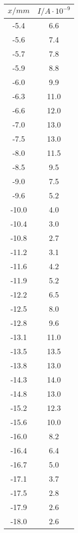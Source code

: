\begin{table}
\begin{minipage}{0.25\textwidth}
	\label{tab:b}
	\begin{tabular}{c|c}
		\toprule
		{$x / mm$} & {$I / A\cdot10^{-9}$} \\
		\hline
        \midrule
        -5.4 & 6.6\\
        -5.6 & 7.4\\
        -5.7 & 7.8\\
        -5.9 & 8.8\\
        -6.0 & 9.9\\
        -6.3 & 11.0\\
        -6.6 & 12.0\\
        -7.0 & 13.0\\
        -7.5 & 13.0\\
        -8.0 & 11.5\\
        -8.5 & 9.5\\
        -9.0 & 7.5\\
        -9.6 & 5.2\\
        -10.0 & 4.0\\
        -10.4 & 3.0\\
        -10.8 & 2.7\\
        -11.2 & 3.1\\
        -11.6 & 4.2\\
        -11.9 & 5.2\\
        -12.2 & 6.5\\
        -12.5 & 8.0\\
        -12.8 & 9.6\\
        -13.1 & 11.0\\
        -13.5 & 13.5\\
        -13.8 & 13.0\\
        -14.3 & 14.0\\
        -14.8 & 13.0\\
        -15.2 & 12.3\\
        -15.6 & 10.0\\
        -16.0 & 8.2\\
        -16.4 & 6.4\\
        -16.7 & 5.0\\
        -17.1 & 3.7\\
        -17.5 & 2.8\\
        -17.9 & 2.6\\
        -18.0 & 2.6 \\
		\bottomrule 
	\end{tabular}
\end{minipage}
\end{table}